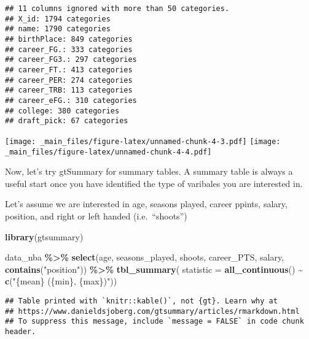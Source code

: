 \documentclass[
]{book}
\newenvironment{Shaded}{\begin{snugshade}}{\end{snugshade}}
\newcommand{\AttributeTok}[1]{\textcolor[rgb]{0.13,0.29,0.53}{#1}}
\newcommand{\FunctionTok}[1]{\textcolor[rgb]{0.13,0.29,0.53}{\textbf{#1}}}
\newcommand{\NormalTok}[1]{#1}
\newcommand{\SpecialCharTok}[1]{\textcolor[rgb]{0.81,0.36,0.00}{\textbf{#1}}}
\newcommand{\StringTok}[1]{\textcolor[rgb]{0.31,0.60,0.02}{#1}}
\begin{document}
\begin{verbatim}
## 11 columns ignored with more than 50 categories.
## X_id: 1794 categories
## name: 1790 categories
## birthPlace: 849 categories
## career_FG.: 333 categories
## career_FG3.: 297 categories
## career_FT.: 413 categories
## career_PER: 274 categories
## career_TRB: 113 categories
## career_eFG.: 310 categories
## college: 380 categories
## draft_pick: 67 categories
\end{verbatim}

\texttt{[image: \_main\_files/figure-latex/unnamed-chunk-4-3.pdf]} \texttt{[image: \_main\_files/figure-latex/unnamed-chunk-4-4.pdf]}

Now, let's try gtSummary for summary tables. A summary table is always a useful start once you have identified the type of varibales you are interested in.

Let's assume we are interested in age, seasons played, career ppints, salary,
position, and right or left handed (i.e.~``shoots'')

\begin{Shaded}
\begin{Highlighting}[]
\FunctionTok{library}\NormalTok{(gtsummary)}

\NormalTok{data\_nba }\SpecialCharTok{\%\textgreater{}\%} 
  \FunctionTok{select}\NormalTok{(age, seasons\_played, shoots, career\_PTS, salary, }\FunctionTok{contains}\NormalTok{(}\StringTok{"position"}\NormalTok{)) }\SpecialCharTok{\%\textgreater{}\%}
         \FunctionTok{tbl\_summary}\NormalTok{(}
           \AttributeTok{statistic =} \FunctionTok{all\_continuous}\NormalTok{() }\SpecialCharTok{\textasciitilde{}} \FunctionTok{c}\NormalTok{(}\StringTok{"\{mean\} (\{min\}, \{max\})"}\NormalTok{))}
\end{Highlighting}
\end{Shaded}

\begin{verbatim}
## Table printed with `knitr::kable()`, not {gt}. Learn why at
## https://www.danieldsjoberg.com/gtsummary/articles/rmarkdown.html
## To suppress this message, include `message = FALSE` in code chunk header.
\end{verbatim}
\end{document}
